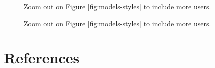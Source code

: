 \documentclass[handout]{beamer}
\begin{document}
\begin{frame}

\begin{figure}[]
\begin{center}
\caption[Prediction Exploration for Varying User and Model]{Zoom out on Figure \ref{fig:models-styles} to include more users.}
\label{fig:users-models-styles}
\end{center}
\end{figure}

\end{frame}

\begin{frame}

\begin{figure}[]
\begin{center}
\caption[Prediction Exploration for Varying User and Model]{Zoom out on Figure \ref{fig:models-styles} to include more users.}
\label{fig:users-models-styles}
\end{center}
\end{figure}

\end{frame}



\section{References}

\nocite{hastieElementsStatisticalLearning2009}

{}



\end{document}
